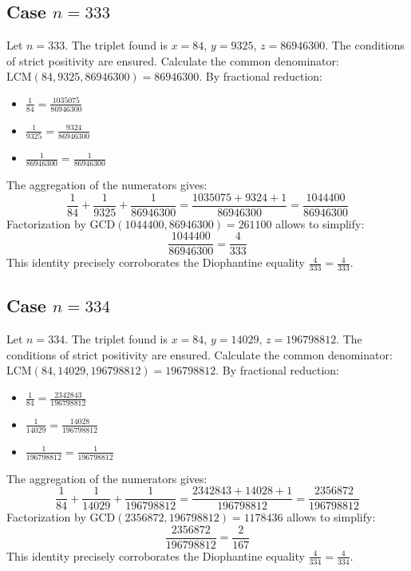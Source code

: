 \documentclass[11pt,a4paper]{article}
\begin{document}
\subsection{Case $n = 333$}
Let $n = 333$. The triplet found is $x = 84$, $y = 9325$, $z = 86946300$.
The conditions of strict positivity are ensured.
Calculate the common denominator: $\text{LCM}(84, 9325, 86946300) = 86946300$.
By fractional reduction:
\begin{itemize}
    \item $\frac{1}{84} = \frac{1035075}{86946300}$
    \item $\frac{1}{9325} = \frac{9324}{86946300}$
    \item $\frac{1}{86946300} = \frac{1}{86946300}$
\end{itemize}
The aggregation of the numerators gives:
$$ \frac{1}{84} + \frac{1}{9325} + \frac{1}{86946300} = \frac{1035075 + 9324 + 1}{86946300} = \frac{1044400}{86946300} $$
Factorization by $\text{GCD}(1044400, 86946300) = 261100$ allows to simplify:
$$ \frac{1044400}{86946300} = \frac{4}{333} $$
This identity precisely corroborates the Diophantine equality $\frac{4}{333} = \frac{4}{333}$.

\subsection{Case $n = 334$}
Let $n = 334$. The triplet found is $x = 84$, $y = 14029$, $z = 196798812$.
The conditions of strict positivity are ensured.
Calculate the common denominator: $\text{LCM}(84, 14029, 196798812) = 196798812$.
By fractional reduction:
\begin{itemize}
    \item $\frac{1}{84} = \frac{2342843}{196798812}$
    \item $\frac{1}{14029} = \frac{14028}{196798812}$
    \item $\frac{1}{196798812} = \frac{1}{196798812}$
\end{itemize}
The aggregation of the numerators gives:
$$ \frac{1}{84} + \frac{1}{14029} + \frac{1}{196798812} = \frac{2342843 + 14028 + 1}{196798812} = \frac{2356872}{196798812} $$
Factorization by $\text{GCD}(2356872, 196798812) = 1178436$ allows to simplify:
$$ \frac{2356872}{196798812} = \frac{2}{167} $$
This identity precisely corroborates the Diophantine equality $\frac{4}{334} = \frac{4}{334}$.
\end{document}

